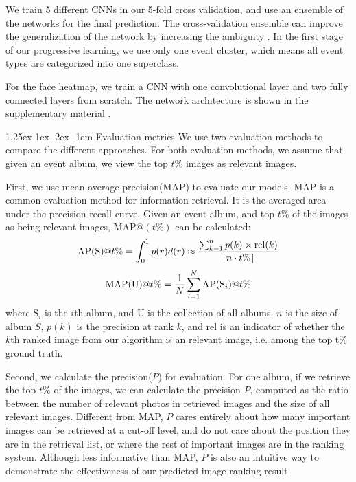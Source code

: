 \documentclass[10pt,twocolumn,letterpaper]{article}
\makeatletter
\renewcommand\paragraph{\@startsection{paragraph}{4}{\z@}%
           {1.25ex \@plus1ex \@minus.2ex}%
           {-1em}%
           {\normalfont\normalsize\bfseries}}
\makeatother
\begin{document}
We train 5 different CNNs in our 5-fold cross validation,  and use an ensemble of the networks for the final prediction. The cross-validation ensemble can improve the generalization of the network by increasing the ambiguity \cite{ensemble}. In the first stage of our progressive learning, we use only one event cluster, which means all event types are categorized into one superclass. 

For the face heatmap, we train a CNN with one convolutional layer and two fully connected layers from scratch. The network architecture is shown in the supplementary material \cite{supplementary}. 

\paragraph{Evaluation metrics} 
We use two evaluation methods to compare the different approaches. For both evaluation methods, we assume that given an event album, we view the top $t\%$ images as relevant images. 

First, we use mean average precision(MAP) to evaluate our models. MAP is a common evaluation method for information retrieval. It is the averaged area under the precision-recall curve. Given an event album, and top $t\%$ of the images as being relevant images, $\text{MAP}@(t\%)$ can be calculated:
\begin{equation}
\textup{AP(S)}@t\%=\int_{0}^{1}p(r)d(r)\approx \frac{\sum_{k=1}^{n}p(k)\times \textup{rel}(k)}{\left \lceil n\cdot t\% \right \rceil}
\end{equation}
\begin{equation}
\textup{MAP(U)}@t\% = \frac{1}{N}\sum_{i=1}^{N}\textup{AP}(\textup{S}_{i})@t\%
\end{equation}
where $\text{S}_{i}$ is the $i$th album, and $\text{U}$ is the collection of all albums. $n$ is the size of album $S$,  $p(k)$ is the precision at rank $k$, and $\text{rel}$ is an indicator of whether the $k$th ranked image from our algorithm is an relevant image, i.e. among the top t\% ground truth.

Second, we calculate the precision($P$) for evaluation. For one album, if we retrieve the top $t\%$ of the images, we can calculate the precision $P$, computed as the ratio between the number of relevant photos in retrieved images and the size of all relevant images. Different from MAP, $P$ cares entirely about how many important images can be retrieved at a cut-off level, and do not care about the position they are in the retrieval list, or where the rest of important images are in the ranking system. Although less informative than MAP, $P$ is also an intuitive way to demonstrate the effectiveness of our predicted image ranking result.
\end{document}
